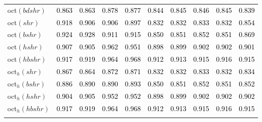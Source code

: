 \begin{tabular}[t]{l|ccccccccc}
oct$(bdshr)$ & \textcolor{black}{0.863} & \textcolor{black}{0.863} & \textcolor{black}{0.878} & \textcolor{black}{0.877} & \textcolor{black}{0.844} & \textcolor{black}{0.845} & \textcolor{black}{0.846} & \textcolor{black}{0.845} & \textcolor{black}{0.839}\\
oct$(shr)$ & \textcolor{black}{0.918} & \textcolor{black}{0.906} & \textcolor{black}{0.906} & \textcolor{black}{0.897} & \textcolor{black}{0.832} & \textcolor{black}{0.832} & \textcolor{black}{0.833} & \textcolor{black}{0.832} & \textcolor{black}{0.854}\\
oct$(bshr)$ & \textcolor{black}{0.924} & \textcolor{black}{0.928} & \textcolor{black}{0.911} & \textcolor{black}{0.915} & \textcolor{black}{0.850} & \textcolor{black}{0.851} & \textcolor{black}{0.852} & \textcolor{black}{0.851} & \textcolor{black}{0.869}\\
oct$(hshr)$ & \textcolor{black}{0.907} & \textcolor{black}{0.905} & \textcolor{black}{0.962} & \textcolor{black}{0.951} & \textcolor{black}{0.898} & \textcolor{black}{0.899} & \textcolor{black}{0.902} & \textcolor{black}{0.902} & \textcolor{black}{0.901}\\
oct$(hbshr)$ & \textcolor{black}{0.917} & \textcolor{black}{0.919} & \textcolor{black}{0.964} & \textcolor{black}{0.968} & \textcolor{black}{0.912} & \textcolor{black}{0.913} & \textcolor{black}{0.915} & \textcolor{black}{0.916} & \textcolor{black}{0.915}\\
oct$_h(shr)$ & \textcolor{black}{0.867} & \textcolor{black}{0.864} & \textcolor{black}{0.872} & \textcolor{black}{0.871} & \textcolor{black}{0.832} & \textcolor{black}{0.832} & \textcolor{black}{0.833} & \textcolor{black}{0.832} & \textcolor{black}{0.834}\\
oct$_h(bshr)$ & \textcolor{black}{0.886} & \textcolor{black}{0.890} & \textcolor{black}{0.890} & \textcolor{black}{0.893} & \textcolor{black}{0.850} & \textcolor{black}{0.851} & \textcolor{black}{0.852} & \textcolor{black}{0.851} & \textcolor{black}{0.852}\\
oct$_h(hshr)$ & \textcolor{black}{0.904} & \textcolor{black}{0.905} & \textcolor{black}{0.952} & \textcolor{black}{0.952} & \textcolor{black}{0.898} & \textcolor{black}{0.899} & \textcolor{black}{0.902} & \textcolor{black}{0.902} & \textcolor{black}{0.902}\\
oct$_h(hbshr)$ & \textcolor{black}{0.917} & \textcolor{black}{0.919} & \textcolor{black}{0.964} & \textcolor{black}{0.968} & \textcolor{black}{0.912} & \textcolor{black}{0.913} & \textcolor{black}{0.915} & \textcolor{black}{0.916} & \textcolor{black}{0.915}\\[-1.5ex]
\hline\\[-1.5ex]
\bottomrule
\end{tabular}
